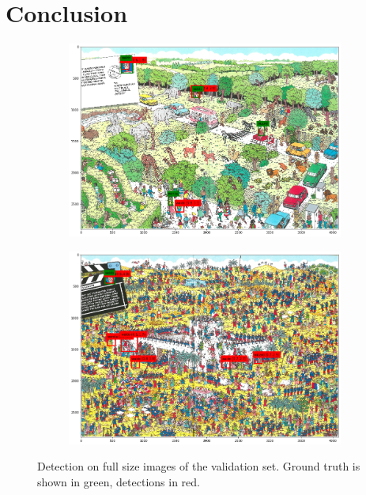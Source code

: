 \documentclass[11pt]{article}
\begin{document}
\section{Conclusion}
\begin{figure}
    \centering
    \begin{subfigure}{0.45\linewidth}
    \includegraphics[width=\linewidth]{figures/detections_2}
    \end{subfigure}
    \begin{subfigure}{0.45\linewidth}
    \includegraphics[width=\linewidth]{figures/detections_3}
    \end{subfigure}
    \caption{Detection on full size images of the validation set. Ground truth is shown in green, detections in red.}
    \label{fig:detections-img}
\end{figure}
\end{document}
